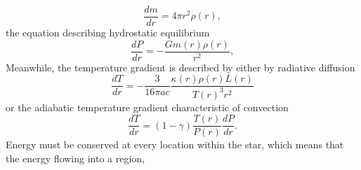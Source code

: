 \begin{equation}
    \frac{dm}{dr} = 4\pi r^2 \rho(r),
\end{equation}
the equation describing hydrostatic equilibrium
\begin{equation}
    \frac{dP}{dr} = -\frac{G m(r)\rho(r)}{r^2},
\end{equation}
Meanwhile, the temperature gradient is described by either by radiative diffusion
\begin{equation}
    \frac{dT}{dr} = -\frac{3}{16\pi ac}\frac{\kappa(r) \rho(r) L(r)}{T(r)^3 r^2}
\end{equation}
or the adiabatic temperature gradient characteristic of convection
\begin{equation}
    \frac{dT}{dr} = (1 - \gamma)\frac{T(r)}{P(r)}\frac{dP}{dr}.
\end{equation}
Energy must be conserved at every location within the star, which means that the energy flowing into a region,